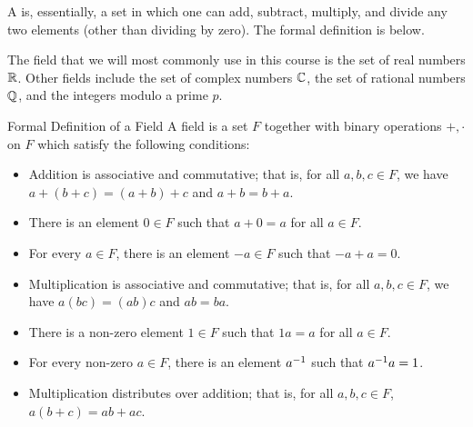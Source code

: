 

\endedxvertical





A {} is, essentially, a set in which one can add, subtract, multiply, and
divide any two elements (other than dividing by zero).  The formal definition is below.  

The field that we will
most commonly use in this course is the set of real numbers $\mathbb R$.  Other fields include
the set of complex numbers $\mathbb C$, the set of rational numbers $\mathbb Q$, and the integers modulo
a prime $p$.  

\begin{edXshowhide}{Formal Definition of a Field}
A field is a set $F$ together with binary operations $+, \cdot$ on $F$ which satisfy the
following conditions:

\begin{itemize}
\item Addition is associative and commutative; that is, for all $a,b,c \in F$, we have
$a+(b+c) = (a+b)+c$ and $a+b  = b+a$.  
\item There is an element $0 \in F$ such that $a+0 = a$ for all $a \in F$.
\item For every $a\in F$, there is an element $-a \in F$ such that $-a + a = 0$.  
\item Multiplication is associative and commutative; that is, for all $a,b,c \in F$, we have
$a(bc) = (ab)c$ and $ab  = ba$.  
\item There is a non-zero element $1 \in F$ such that $1a = a$ for all $a \in F$.  
\item For every non-zero $a\in F$, there is an element $a^{-1}$ such that $a^{-1} a = 1$.  
\item Multiplication distributes over addition; that is, for all $a,b,c \in F$, $a(b+c) = ab + ac$.  
\end{itemize}

\end{edXshowhide}




\endedxtext

\endedxvertical

